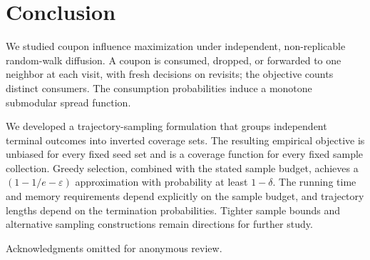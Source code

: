 \documentclass[sigconf]{acmart}
\begin{document}
\section{Conclusion}
\label{sec:conclusion}

We studied coupon influence maximization under independent,
non-replicable random-walk diffusion. A coupon is consumed, dropped,
or forwarded to one neighbor at each visit, with fresh decisions on
revisits; the objective counts distinct consumers. The consumption
probabilities induce a monotone submodular spread function.

We developed a trajectory-sampling formulation that groups independent
terminal outcomes into inverted coverage sets. The resulting empirical
objective is unbiased for every fixed seed set and is a coverage
function for every fixed sample collection. Greedy selection, combined
with the stated sample budget, achieves a $(1-1/e-\varepsilon)$
approximation with probability at least $1-\delta$.
The running time and memory requirements depend explicitly on the
sample budget, and trajectory lengths depend on the termination
probabilities. Tighter sample bounds and alternative sampling
constructions remain directions for further study.

\begin{acks}
Acknowledgments omitted for anonymous review.
\end{acks}



\end{document}
